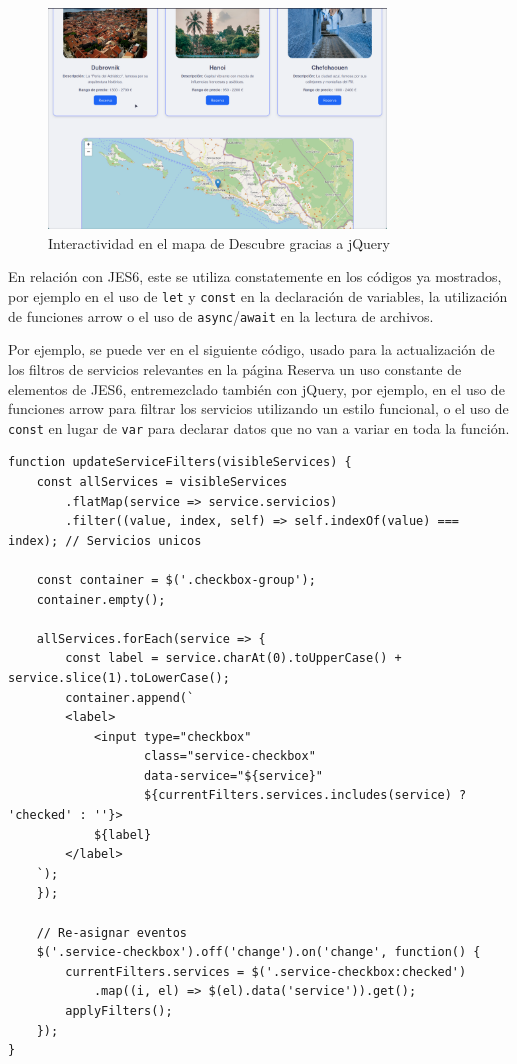 \documentclass[11pt, a4paper]{book}
\begin{document}
	\begin{figure} [H]
		\centering
        \includegraphics[width=0.8\textwidth]{CSS/4 extra.png}
		\caption{Interactividad en el mapa de Descubre gracias a jQuery}
	\end{figure}

    En relación con JES6, este se utiliza constatemente en los códigos ya mostrados, por ejemplo en el uso de \texttt{let} y \texttt{const} en la declaración de variables, la utilización de funciones arrow o el uso de \texttt{async}/\texttt{await} en la lectura de archivos.

    Por ejemplo, se puede ver en el siguiente código, usado para la actualización de los filtros de servicios relevantes en la página Reserva un uso constante de elementos de JES6, entremezclado también con jQuery, por ejemplo, en el uso de funciones arrow para filtrar los servicios utilizando un estilo funcional, o el uso de \texttt{const} en lugar de \texttt{var} para declarar datos que no van a variar en toda la función. 

    \begin{lstlisting}
function updateServiceFilters(visibleServices) {
    const allServices = visibleServices
        .flatMap(service => service.servicios)
        .filter((value, index, self) => self.indexOf(value) === index); // Servicios unicos

    const container = $('.checkbox-group');
    container.empty();

    allServices.forEach(service => {
        const label = service.charAt(0).toUpperCase() + service.slice(1).toLowerCase();
        container.append(`
        <label>
            <input type="checkbox" 
                   class="service-checkbox" 
                   data-service="${service}"
                   ${currentFilters.services.includes(service) ? 'checked' : ''}>
            ${label}
        </label>
    `);
    });

    // Re-asignar eventos
    $('.service-checkbox').off('change').on('change', function() {
        currentFilters.services = $('.service-checkbox:checked')
            .map((i, el) => $(el).data('service')).get();
        applyFilters();
    });
}
    \end{lstlisting}
	
\end{document}
